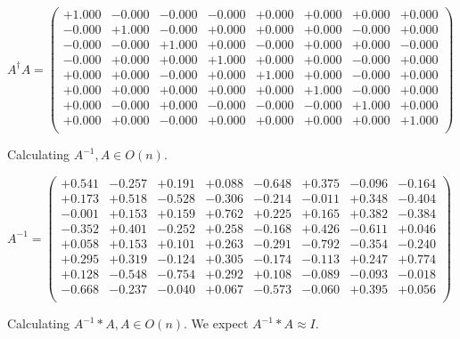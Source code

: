 \documentclass[9pt]{article}
\theoremstyle{plain}
\theoremstyle{definition}
\theoremstyle{remark}
\numberwithin{equation}{section}
\begin{document}
$A^{\dag} A = \left(
\begin{array}{
cccccccc}
+1.000 & -0.000 & -0.000 & -0.000 & +0.000 & +0.000 & +0.000 & +0.000 \\
-0.000 & +1.000 & -0.000 & +0.000 & +0.000 & +0.000 & -0.000 & +0.000 \\
-0.000 & -0.000 & +1.000 & +0.000 & -0.000 & +0.000 & +0.000 & -0.000 \\
-0.000 & +0.000 & +0.000 & +1.000 & +0.000 & +0.000 & -0.000 & +0.000 \\
+0.000 & +0.000 & -0.000 & +0.000 & +1.000 & +0.000 & -0.000 & +0.000 \\
+0.000 & +0.000 & +0.000 & +0.000 & +0.000 & +1.000 & -0.000 & +0.000 \\
+0.000 & -0.000 & +0.000 & -0.000 & -0.000 & -0.000 & +1.000 & +0.000 \\
+0.000 & +0.000 & -0.000 & +0.000 & +0.000 & +0.000 & +0.000 & +1.000 \\
\end{array}
\right)$ \newline 

Calculating $A^{-1} ,  A \in O(n)$.

$A^{-1} = \left(
\begin{array}{
cccccccc}
+0.541 & -0.257 & +0.191 & +0.088 & -0.648 & +0.375 & -0.096 & -0.164 \\
+0.173 & +0.518 & -0.528 & -0.306 & -0.214 & -0.011 & +0.348 & -0.404 \\
-0.001 & +0.153 & +0.159 & +0.762 & +0.225 & +0.165 & +0.382 & -0.384 \\
-0.352 & +0.401 & -0.252 & +0.258 & -0.168 & +0.426 & -0.611 & +0.046 \\
+0.058 & +0.153 & +0.101 & +0.263 & -0.291 & -0.792 & -0.354 & -0.240 \\
+0.295 & +0.319 & -0.124 & +0.305 & -0.174 & -0.113 & +0.247 & +0.774 \\
+0.128 & -0.548 & -0.754 & +0.292 & +0.108 & -0.089 & -0.093 & -0.018 \\
-0.668 & -0.237 & -0.040 & +0.067 & -0.573 & -0.060 & +0.395 & +0.056 \\
\end{array}
\right)$ \newline 

Calculating $A^{-1} *A  ,  A \in O(n)$.   We expect $A^{-1} *A  \approx I$. 
\end{document}
